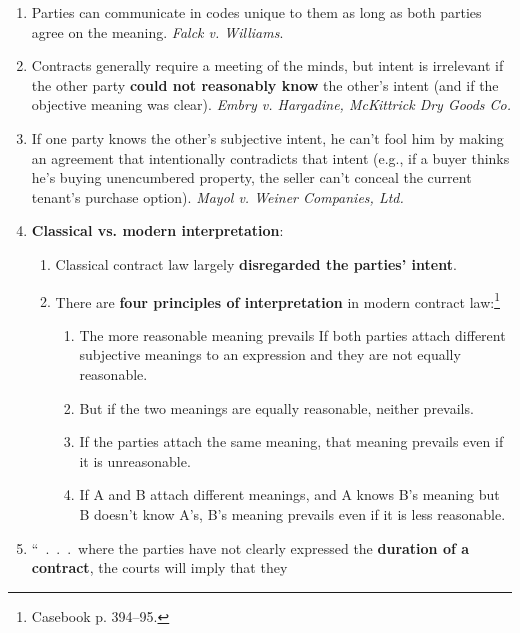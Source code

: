 \begin{enumerate}
\begin{enumerate}
        \item Parties can communicate in codes unique to them as long as both 
        parties agree on the meaning. \emph{Falck v. Williams}.
        \item Contracts generally require a meeting of the minds, but intent 
        is irrelevant if the other party \textbf{could not reasonably know} 
        the other's intent (and if the objective meaning was clear). 
        \emph{Embry v.  Hargadine, McKittrick Dry Goods Co.}
        \item If one party knows the other's subjective intent, he can't fool 
        him by making an agreement that intentionally contradicts that intent 
        (e.g., if a buyer thinks he's buying unencumbered property, the seller 
        can't conceal the current tenant's purchase option). \emph{Mayol v. 
        Weiner Companies, Ltd.}
        \item \textbf{Classical vs. modern interpretation}:
        \begin{enumerate}
            \item Classical contract law largely \textbf{disregarded the 
            parties' intent}.
            \item There are \textbf{four principles of interpretation} in 
            modern contract law:\footnote{Casebook p. 394--95.}
            \begin{enumerate}
                \item The more reasonable meaning prevails If both parties 
                attach different subjective meanings to an expression  and 
                they are not equally reasonable.
                \item But if the two meanings are equally reasonable, neither 
                prevails.
                \item If the parties attach the same meaning, that meaning 
                prevails even if it is unreasonable.
                \item If A and B attach different meanings, and A knows B's 
                meaning but B doesn't know A's, B's meaning prevails even if 
                it is less reasonable.
            \end{enumerate}
        \end{enumerate}
        \item ``~.~.~.~where the parties have not clearly expressed the 
        \textbf{duration of a contract}, the courts will imply that they 

\end{enumerate}
\end{enumerate}
